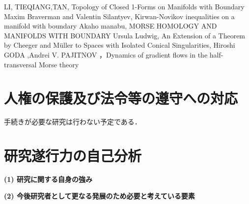 \documentclass[11pt,a4j,dvipdfmx]{jarticle} 					%
\newcommand{\研究課題名}{象の卵}
\newcommand{\研究機関名}{京都大学}
\newcommand{\研究代表者氏名}{福士謙二}
\begin{document}
	\vspace{1cm}
	\begin{thebibliography}{99}
		 LI, TIEQIANG,TAN, Topology of Closed 1-Forms on Manifolds with Boundary
		 Maxim Braverman and Valentin Silantyev, Kirwan-Novikov inequalities on a manifold with boundary
		 Akaho manabu, MORSE HOMOLOGY AND MANIFOLDS WITH BOUNDARY
		 Ursula Ludwig, An Extension of a Theorem by Cheeger and Müller to Spaces with Isolated Conical Singularities,
		 Hiroshi GODA ,Andrei V. PAJITNOV ，Dynamics of gradient flows in the half-transversal Morse theory
	\end{thebibliography}



\section{人権の保護及び法令等の遵守への対応}

手続きが必要な研究は行わない予定である．





\section{研究遂行力の自己分析}


\noindent
\textbf{(1) 研究に関する自身の強み}




\vspace{5mm}
\noindent
\textbf{(2) 今後研究者として更なる発展のため必要と考えている要素}
\end{document}

